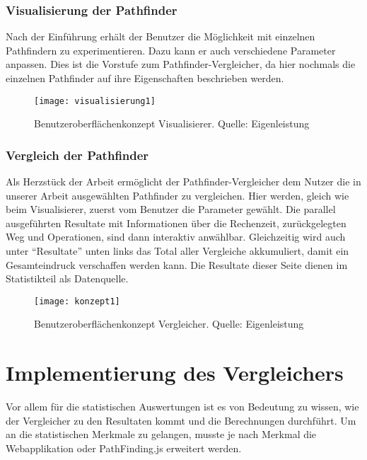\clearpage

\subsubsection{Visualisierung der Pathfinder}
Nach der Einführung erhält der Benutzer die Möglichkeit mit einzelnen Pathfindern zu experimentieren. Dazu kann er auch verschiedene Parameter anpassen. Dies ist die Vorstufe zum Pathfinder-Vergleicher, da hier nochmals die einzelnen Pathfinder auf ihre Eigenschaften beschrieben werden.
\begin{figure}[H]
  \centering
  \texttt{[image: visualisierung1]}
  \caption[Benutzeroberflächenkonzept des Pathfinding-Visualisierers.]{Benutzeroberflächenkonzept Visualisierer. Quelle: Eigenleistung}
  \label{fig:gui_konzept_visualizer}
\end{figure}

\clearpage

\subsubsection{Vergleich der Pathfinder}
Als Herzstück der Arbeit ermöglicht der Pathfinder-Vergleicher dem Nutzer die in unserer Arbeit ausgewählten Pathfinder zu vergleichen. Hier werden, gleich wie beim Visualisierer, zuerst vom Benutzer die Parameter gewählt. Die parallel ausgeführten Resultate mit Informationen über die Rechenzeit, zurückgelegten Weg und Operationen, sind dann interaktiv anwählbar. Gleichzeitig wird auch unter ``Resultate'' unten links das Total aller Vergleiche akkumuliert, damit ein Gesamteindruck verschaffen werden kann. Die Resultate dieser Seite dienen im Statistikteil als Datenquelle.

\begin{figure}[H]
  \centering
  \texttt{[image: konzept1]}
  \caption[Benutzeroberflächenkonzept des Pathfinder-Vergleichers.]{Benutzeroberflächenkonzept Vergleicher. Quelle: Eigenleistung}
  \label{fig:gui_konzept_comparator}
\end{figure}

\section{Implementierung des Vergleichers}
Vor allem für die statistischen Auswertungen ist es von Bedeutung zu wissen, wie der Vergleicher zu den Resultaten kommt und die Berechnungen durchführt. Um an die statistischen Merkmale zu gelangen, musste je nach Merkmal die Webapplikation oder PathFinding.js erweitert werden.

